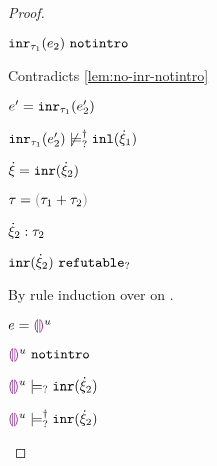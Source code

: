 \begin{proof}
\begin{byCases}
\begin{byCases}
\begin{byCases}
          \item[\text{(\ref{rule:IVIndet})}] 
          \begin{pfsteps*}
          \item $\mathtt{inr}_{\tau_1}({e_2}) ~\mathtt{notintro}$ 
          \end{pfsteps*} 
          Contradicts \autoref{lem:no-inr-notintro}
          \item[\text{(\ref{rule:IVInr})}] 
          \begin{pfsteps*}
          \item $e'=\mathtt{inr}_{\tau_1}({e_2'})$ 
          \item $\mathtt{inr}_{\tau_1}({e_2'}) \not\models_{?}^{\dag} \mathtt{inl}(\dot{\xi}_1)$ 
          \end{pfsteps*} 
        \end{byCases}
      \end{byCases} 
    \item[\text{(\ref{rule:CTInr})}]
    \begin{pfsteps*}
      \item $\dot{\xi} = \mathtt{inr}(\dot{\xi}_2)$ 
      \item $\tau = \tsum{\tau_1}{\tau_2}$ 
      \item $\dot{\xi}_2 : \tau_2$  
      \item $\mathtt{inr}(\dot{\xi}_2) ~\mathtt{refutable}_?$  
      \end{pfsteps*}
      By rule induction over  on .
      \begin{byCases}
        \item[\text{(\ref{rule:IEHole})}]
        \begin{pfsteps*}
        \item $e=\textcolor{violet}{\llparenthesis}\textcolor{violet}{\rrparenthesis}^{u}$ 
        \item $\textcolor{violet}{\llparenthesis}\textcolor{violet}{\rrparenthesis}^{u} ~\mathtt{notintro}$  
        \item $\textcolor{violet}{\llparenthesis}\textcolor{violet}{\rrparenthesis}^{u} \models_{?} \mathtt{inr}(\dot{\xi}_2)$  
        \item $\textcolor{violet}{\llparenthesis}\textcolor{violet}{\rrparenthesis}^{u} \models_{?}^{\dag} \mathtt{inr}(\dot{\xi}_2)$ 
        \end{pfsteps*}

\end{byCases}
\end{byCases}
\end{proof}
